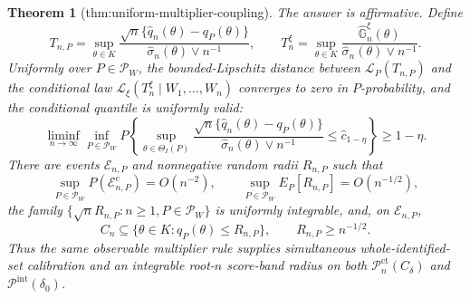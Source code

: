 \documentclass{article}
\newtheorem{theorem}{Theorem}
\begin{document}
\begin{theorem}[thm:uniform-multiplier-coupling]\label{thm:uniform-multiplier-coupling}
The answer is affirmative.  Define
\[
 T_{n,P}=\sup_{\theta\in K}
 \frac{\sqrt n\{\widehat q_n(\theta)-q_P(\theta)\}}
      {\widehat\sigma_n(\theta)\vee n^{-1}},
 \qquad
 T_n^{\xi}=\sup_{\theta\in K}
 \frac{\widehat{\mathbb G}_n^{\xi}(\theta)}
      {\widehat\sigma_n(\theta)\vee n^{-1}}.
\]
Uniformly over \(P\in\mathcal P_W\), the bounded-Lipschitz distance between \(\mathcal L_P(T_{n,P})\) and the conditional law \(\mathcal L_\xi(T_n^{\xi}\mid W_1,\ldots,W_n)\) converges to zero in \(P\)-probability, and the conditional quantile is uniformly valid:
\[
 \liminf_{n\to\infty}\inf_{P\in\mathcal P_W}
 P\!\left\{
 \sup_{\theta\in\Theta_I(P)}
 \frac{\sqrt n\{\widehat q_n(\theta)-q_P(\theta)\}}
      {\widehat\sigma_n(\theta)\vee n^{-1}}
 \leq\widehat c_{1-\eta}\right\}\geq1-\eta. \tag{A}
\]
There are events \(\mathcal E_{n,P}\) and nonnegative random radii \(R_{n,P}\) such that
\[
 \sup_{P\in\mathcal P_W}P(\mathcal E_{n,P}^c)=O(n^{-2}),
 \qquad
 \sup_{P\in\mathcal P_W}E_P[R_{n,P}]=O(n^{-1/2}), \tag{B}
\]
the family \(\{\sqrt nR_{n,P}:n\geq1,P\in\mathcal P_W\}\) is uniformly integrable, and, on \(\mathcal E_{n,P}\),
\[
 C_n\subseteq\{\theta\in K:q_P(\theta)\leq R_{n,P}\},
 \qquad R_{n,P}\geq n^{-1/2}. \tag{C}
\]
Thus the same observable multiplier rule supplies simultaneous whole-identified-set calibration and an integrable root-\(n\) score-band radius on both \(\mathcal P_n^{\mathrm{ct}}(C_\delta)\) and \(\mathcal P^{\mathrm{int}}(\delta_0)\).
\end{theorem}
\end{document}
